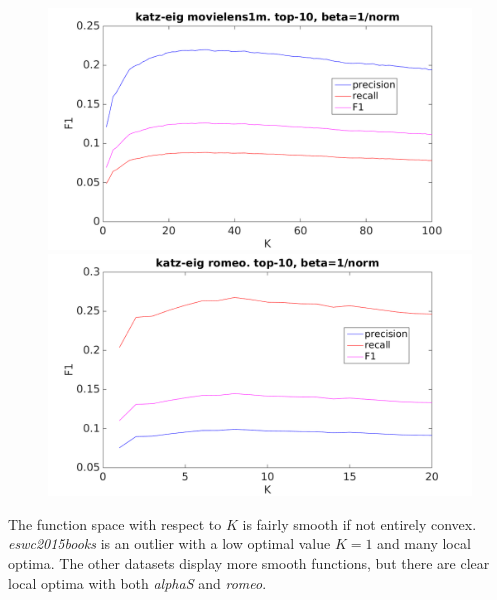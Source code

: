 \begin{figure}[h!]
\centering
\begin{minipage}{.5\textwidth}
    \centering
    \includegraphics[width=\linewidth]{fig/katzeig_k/movielens_katzeig_K.png}
\end{minipage}%
\begin{minipage}{.5\textwidth}
    \centering
    \includegraphics[width=\linewidth]{fig/katzeig_k/romeo_katzeig_K.png}
\end{minipage}
\end{figure}

\FloatBarrier

The function space with respect to $K$ is fairly smooth if not entirely convex. \textit{eswc2015books} is an outlier with a low optimal value $K = 1$ and many local optima. The other datasets display more smooth functions, but there are clear local optima with both \textit{alphaS} and \textit{romeo}.

